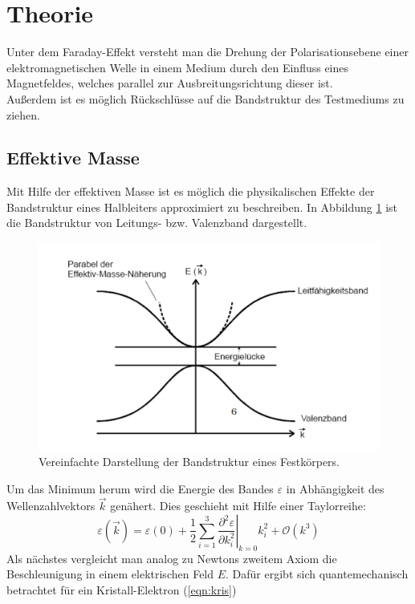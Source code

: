 \section{Theorie}
\label{sec:Theorie}
Unter dem Faraday-Effekt versteht man die Drehung der Polarisationsebene einer elektromagnetischen Welle in einem Medium durch den Einfluss eines Magnetfeldes, welches parallel zur Ausbreitungsrichtung dieser ist. \\
Außerdem ist es möglich Rückschlüsse auf die Bandstruktur des Testmediums zu ziehen.
\subsection{Effektive Masse}
\label{sec:effektive_masse}
Mit Hilfe der effektiven Masse ist es möglich die physikalischen Effekte der Bandstruktur eines Halbleiters approximiert zu beschreiben. In Abbildung \ref{fig:band} ist die Bandstruktur von Leitungs- bzw. Valenzband dargestellt.
\begin{figure}
  \centering
  \includegraphics[scale=0.7]{fig/band.png}
  \caption{Vereinfachte Darstellung der Bandstruktur eines Festkörpers. \cite[6]{Bild2}}
  \label{fig:band}
\end{figure}
Um das Minimum herum wird die Energie des Bandes $\varepsilon$ in Abhängigkeit des Wellenzahlvektors $\vec{k}$ genähert. Dies geschieht mit Hilfe einer Taylorreihe:
\begin{equation}
  \label{eqn:energiegl}
  \varepsilon(\vec{k})=\varepsilon(0) + \frac{1}{2}\sum_{i=1}^3 \left.\frac{\partial^2 \varepsilon}{\partial k_i^2}\right|_{k=0}k_i^2 + \mathcal{O}(k^3)
\end{equation}
Als nächstes vergleicht man analog zu Newtons zweitem Axiom die Beschleunigung in einem elektrischen Feld $E$. Dafür ergibt sich quantemechanisch betrachtet für ein Kristall-Elektron (\ref{eqn:kris})
